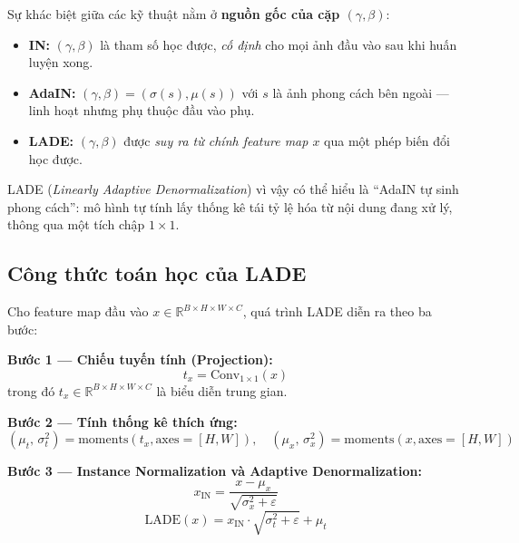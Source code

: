 Sự khác biệt giữa các kỹ thuật nằm ở \textbf{nguồn gốc của cặp $(\gamma, \beta)$}:

\begin{itemize}
    \item \textbf{IN:} $(\gamma, \beta)$ là tham số học được, \textit{cố định} cho mọi ảnh đầu vào sau khi huấn luyện xong.
    \item \textbf{AdaIN:} $(\gamma, \beta) = (\sigma(s), \mu(s))$ với $s$ là ảnh phong cách bên ngoài --- linh hoạt nhưng phụ thuộc đầu vào phụ.
    \item \textbf{LADE:} $(\gamma, \beta)$ được \textit{suy ra từ chính feature map $x$} qua một phép biến đổi học được.
\end{itemize}

LADE (\textit{Linearly Adaptive Denormalization}) \cite{Liu2024} vì vậy có thể hiểu là ``AdaIN tự sinh phong cách'': mô hình tự tính lấy thống kê tái tỷ lệ hóa từ nội dung đang xử lý, thông qua một tích chập $1 \times 1$.

\subsection{Công thức toán học của LADE}
\label{subsec:lade_formula}

Cho feature map đầu vào $x \in \mathbb{R}^{B \times H \times W \times C}$, quá trình LADE diễn ra theo ba bước:

\textbf{Bước 1 --- Chiếu tuyến tính (Projection):}
\begin{equation}
\label{eq:lade_tx}
t_x = \text{Conv}_{1 \times 1}(x)
\end{equation}
trong đó $t_x \in \mathbb{R}^{B \times H \times W \times C}$ là biểu diễn trung gian.

\textbf{Bước 2 --- Tính thống kê thích ứng:}
\begin{equation}
\label{eq:lade_stats}
(\mu_t,\, \sigma_t^2) = \text{moments}(t_x, \text{axes}=[H,W]), \quad
(\mu_x,\, \sigma_x^2) = \text{moments}(x, \text{axes}=[H,W])
\end{equation}

\textbf{Bước 3 --- Instance Normalization và Adaptive Denormalization:}
\begin{equation}
\label{eq:lade_norm}
x_{\text{IN}} = \frac{x - \mu_x}{\sqrt{\sigma_x^2 + \varepsilon}}
\end{equation}
\begin{equation}
\label{eq:lade_output}
\text{LADE}(x) = x_{\text{IN}} \cdot \sqrt{\sigma_t^2 + \varepsilon} + \mu_t
\end{equation}

